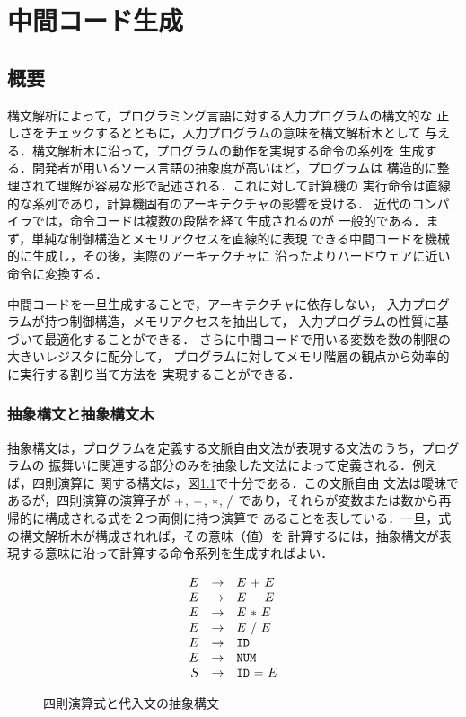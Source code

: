 \documentclass[dvipdfmx,a4j]{jbook}
\begin{document}
\chapter{中間コード生成}
\section{概要}

構文解析によって，プログラミング言語に対する入力プログラムの構文的な
正しさをチェックするとともに，入力プログラムの意味を構文解析木として
与える．構文解析木に沿って，プログラムの動作を実現する命令の系列を
生成する．開発者が用いるソース言語の抽象度が高いほど，プログラムは
構造的に整理されて理解が容易な形で記述される．これに対して計算機の
実行命令は直線的な系列であり，計算機固有のアーキテクチャの影響を受ける．
近代のコンパイラでは，命令コードは複数の段階を経て生成されるのが
一般的である．まず，単純な制御構造とメモリアクセスを直線的に表現
できる中間コードを機械的に生成し，その後，実際のアーキテクチャに
沿ったよりハードウェアに近い命令に変換する．

中間コードを一旦生成することで，アーキテクチャに依存しない，
入力プログラムが持つ制御構造，メモリアクセスを抽出して，
入力プログラムの性質に基づいて最適化することができる．
さらに中間コードで用いる変数を数の制限の大きいレジスタに配分して，
プログラムに対してメモリ階層の観点から効率的に実行する割り当て方法を
実現することができる．

\subsection{抽象構文と抽象構文木}

抽象構文は，プログラムを定義する文脈自由文法が表現する文法のうち，プログラムの
振舞いに関連する部分のみを抽象した文法によって定義される．例えば，四則演算に
関する構文は，図\ref{fig:abstractArithSyntax}で十分である．この文脈自由
文法は曖昧であるが，四則演算の演算子が ${\tt +}$, ${\tt -}$, ${\tt *}$, ${\tt /}$
であり，それらが変数または数から再帰的に構成される式を２つ両側に持つ演算で
あることを表している．一旦，式の構文解析木が構成されれば，その意味（値）を
計算するには，抽象構文が表現する意味に沿って計算する命令系列を生成すればよい．

\begin{figure}
    \[
        \begin{array}{rcl}
            E & \rightarrow & E\ {\tt +}\ E           \\
            E & \rightarrow & E\ {\tt -}\ E           \\
            E & \rightarrow & E\ {\tt *}\ E           \\
            E & \rightarrow & E\ {\tt /}\ E           \\
            E & \rightarrow & \texttt{ID}           \\
            E & \rightarrow & \texttt{NUM}          \\
            S & \rightarrow & \texttt{ID}\ {\tt =}\ E
        \end{array}
    \]
    \caption{四則演算式と代入文の抽象構文}\label{fig:abstractArithSyntax}
\end{figure}
\end{document}
